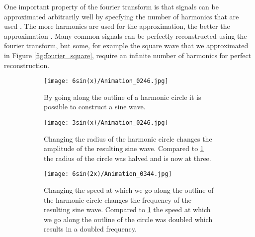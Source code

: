 \documentclass[thesis.tex]{subfiles}
\begin{document}
One important property of the fourier transform is that signals can be approximated arbitrarily well by specfying the number of harmonics that are used \cite{nixon2012feature}. The more harmonics are used for the approximation, the better the approximation \cite{nixon2012feature}. Many common signals can be perfectly reconstructed using the fourier transform, but some, for example the square wave that we approximated in Figure \ref{fig:fourier_square}, require an infinite number of harmonics for perfect reconstruction.

\begin{figure}
\centering
	\begin{subfigure}{\textwidth}
		\centering
		\texttt{[image: 6sin(x)/Animation\_0246.jpg]}
		\caption{By going along the outline of a harmonic circle it is possible to construct a sine wave.}\label{fig:fourier}		
	\end{subfigure}
	\begin{subfigure}[t]{\textwidth}
		\centering
		\texttt{[image: 3sin(x)/Animation\_0246.jpg]}
		\caption{Changing the radius of the harmonic circle changes the amplitude of the resulting sine wave. Compared to \ref{fig:fourier} the radius of the circle was halved and is now at three.}\label{fig:fourier_radius}		
	\end{subfigure}
	\begin{subfigure}[t]{\textwidth}
		\centering
		\texttt{[image: 6sin(2x)/Animation\_0344.jpg]}
		\caption{Changing the speed at which we go along the outline of the harmonic circle changes the frequency of the resulting sine wave. Compared to \ref{fig:fourier} the speed at which we go along the outline of the circle was doubled which results in a doubled frequency.}\label{fig:fourier_speed}		
	\end{subfigure}
	\caption{}
\end{figure}
 \smallskip

%
%
\end{document}
